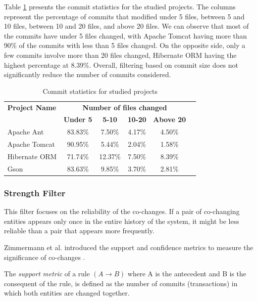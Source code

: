 \documentclass{ieeeaccess}
\begin{document}
Table \ref{tab:commit_statistics} presents the commit statistics for the studied projects. The columns represent the percentage of commits that modified under 5 files, between 5 and 10 files, between 10 and 20 files, and above 20 files. We can observe that most of the commits have under 5 files changed, with Apache Tomcat having more than 90\% of the commits with less than 5 files changed. On the opposite side, only a few commits involve more than 20 files changed, Hibernate ORM having the highest percentage at 8.39\%. Overall, filtering based on commit size does not significantly reduce the number of commits considered.

\begin{table}[ht]
    \centering
    \caption{Commit statistics for studied projects}
    \label{tab:commit_statistics}
    \begin{tabular}{|l|c|c|c|c|c|}
        \hline
	 \textbf{Project Name} & \multicolumn{4}{c|}{\textbf{{Number of files changed} }}  \\ 
	\cline{2-5}
         & \textbf{Under 5} & \textbf{5-10} & \textbf{10-20} & \textbf{Above 20} \\ \hline
        Apache Ant & 83.83\% & 7.50\% & 4.17\% & 4.50\% \\ 
        Apache Tomcat & 90.95\% & 5.44\% & 2.04\% & 1.58\%  \\ 
        Hibernate ORM & 71.74\% & 12.37\% & 7.50\% & 8.39\%  \\ 
        Gson & 83.63\% & 9.85\% & 3.70\% & 2.81\%  \\ \hline
    \end{tabular}
\end{table}


\subsubsection{Strength Filter}

This filter focuses on the reliability of the co-changes. If a pair of co-changing entities appears only once in the entire history of the system, it might be less reliable than a pair that appears more frequently.

Zimmermann et al. introduced the support and confidence metrics to measure the significance of co-changes \cite{b7}.

The \textit{support metric} of a rule $(A \rightarrow B)$ where A is the antecedent and B is the consequent of the rule, is defined as the number of commits (transactions) in which both entities are changed together.
\end{document}
